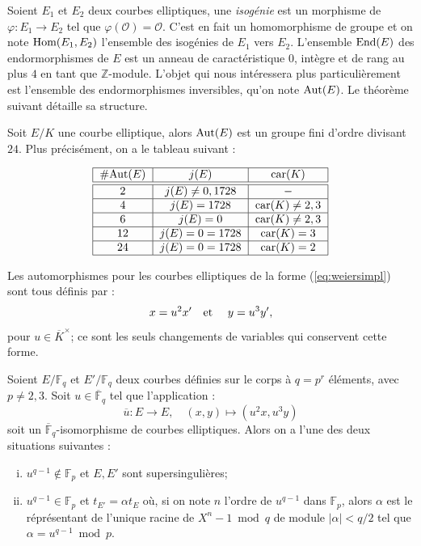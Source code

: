 \documentclass[a4paper]{article} %
\numberwithin{section}{part}
\numberwithin{equation}{section}
\newcommand\GF[1]{\mathbb{F}_{#1}}
\newcommand\ZZ{\mathbb{Z}}
\newcommand\EO{\mathcal{O}}
\newcommand\etmath{\textup{\quad et \quad}}
\begin{document}
Soient $E_1$ et $E_2$ deux courbes elliptiques, une \emph{isogénie} est un
morphisme \cite[p.12]{Sil} de $\varphi : E_1 \rightarrow E_2$ tel que 
$\varphi(\EO) = \EO$. C'est en fait un homomorphisme de groupe et on note 
$\textup{Hom}(E_1, E_2)$ l'ensemble des isogénies de $E_1$ vers $E_2$. 
L'ensemble $\textup{End}(E)$ des endormorphismes de $E$ est un anneau de 
caractéristique $0$, intègre et de rang au plus $4$ en tant que $\ZZ$-module. 
L'objet qui nous intéressera plus particulièrement est l'ensemble des 
endormorphismes inversibles, qu'on note $\textup{Aut}(E)$. Le théorème suivant 
détaille sa structure.
\begin{thm}
\label{th:autell}
Soit $E/K$ une courbe elliptique, alors $\textup{Aut}(E)$ est un groupe fini
d'ordre divisant $24$. Plus précisément, on a le tableau suivant :

\begin{equation}
\begin{tabular}{|c|c|c|}
    \hline
    \#Aut$(E)$ & $j(E)$ & car$(K)$\\
    \hline\hline
    $2$ & $j(E)\neq0,1728$ & $-$\\
    \hline
    $4$ & $j(E) = 1728$ & car$(K)\neq 2, 3$\\
    \hline
    $6$ & $j(E) = 0$ & car$(K)\neq 2, 3$\\
    \hline
    $12$ & $j(E) = 0 = 1728$ & car$(K) = 3$\\
    \hline
    $24$ & $j(E) = 0 = 1728$ & car$(K) = 2$\\
    \hline
\end{tabular}
\end{equation}
\end{thm}
Les automorphismes pour les courbes elliptiques de la forme
(\ref{eq:weiersimpl}) sont tous définis par : 
\begin{equation}
x = u^2x'\etmath y = u^3y',
\end{equation}
pour $u\in\overline{K}^{\times}$; ce sont les seuls changements de variables qui
conservent cette forme.
\begin{prop}
\label{prop:trtwist}
Soient $E/\GF{q}$ et $E'/\GF{q}$ deux courbes définies sur le corps à $q = p^r$
éléments, avec $p\neq2,3$. Soit $u\in\overline{\mathbb{F}}_q$ tel que 
l'application :
\begin{equation}
\overline{u} : E\longrightarrow E,\quad(x,y)\longmapsto(u^2x,u^3y)
\end{equation}
soit un $\overline{\mathbb{F}}_q$-isomorphisme de courbes elliptiques. Alors on 
a l'une des deux situations suivantes :
\begin{enumerate}[(i)]
    \item $u^{q-1}\notin\GF{p}$ et $E, E'$ sont supersingulières;
    \item $u^{q-1}\in\GF{p}$ et $t_{E'} = \alpha t_E$ où, si on note $n$ l'ordre
    de $u^{q-1}$ dans $\GF{p}$, alors $\alpha$ est le réprésentant de l'unique
    racine de $X^n - 1 \bmod q$ de module $\vert{\alpha}\vert < q/2$ tel que
    $\alpha = u^{q-1}\bmod p$.
\end{enumerate}
\end{prop}
\end{document}
